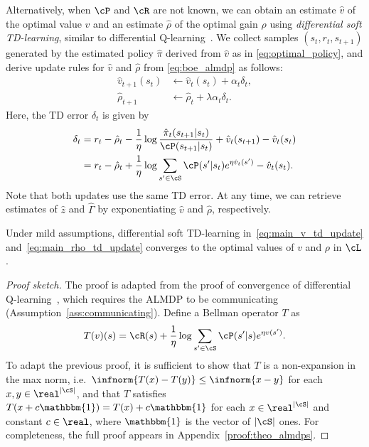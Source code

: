 Alternatively, when $\cP$ and $\cR$ are not known, we can obtain an estimate $\hat v$ of the optimal value $v$ and an estimate $\hat\rho$ of the optimal gain $\rho$ using \textit{differential soft TD-learning}, similar to differential Q-learning~\citep{Wan2021}. We collect samples $(s_t, r_t, s_{t+1})$ generated by the estimated policy $\hat\pi$ derived from $\hat v$ as in \eqref{eq:optimal_policy}, and derive update rules for $\hat v$ and $\hat \rho$ from \eqref{eq:boe_almdp} as follows:
\begin{align}
    \hat{v}_{t+1}(s_t) &\gets \hat{v}_t(s_t) + \alpha_t \delta_t,\label{eq:main_v_td_update}\\
    \hat{\rho}_{t+1} &\gets \hat{\rho}_t + \lambda \alpha_t \delta_t.\label{eq:main_rho_td_update}
    \end{align}
Here, the TD error $\delta_t$ is given by
\begin{align*}
\delta_t &= r_t - \hat{\rho}_t - \frac 1 \eta \log \frac {\hat{\pi}_t(s_{t+1}|s_t)} {\cP(s_{t+1}|s_t)} + \hat{v}_t(s_{t+1}) - \hat{v}_t(s_t)\\
 &= r_t - \hat{\rho}_t + \frac 1 \eta \log \sum_{s'\in\cS} \cP(s'|s_t) e^{\eta \hat{v}_t(s')} - \hat{v}_t(s_t).
\end{align*}
Note that both updates use the same TD error. At any time, we can retrieve estimates of $\hat z$ and $\widehat\Gamma$ by exponentiating $\hat v$ and $\hat \rho$, respectively.

\begin{theorem}
    Under mild assumptions, differential soft TD-learning in~\eqref{eq:main_v_td_update} and~\eqref{eq:main_rho_td_update} converges to the optimal values of $v$ and $\rho$ in $\cL$. \label{theo:almdps}
\end{theorem}

\begin{proof}[Proof sketch]
The proof is adapted from the proof of convergence of differential Q-learning~\cite{Abounadi2001,Wan2021}, which requires the ALMDP to be communicating (Assumption~\ref{ass:communicating}).
Define a Bellman operator $T$ as
\[
T(v)(s) = \cR(s) + \frac 1 \eta \log \sum_{s'\in\cS} \cP(s'|s) e^{ \eta v(s') }.
\]
To adapt the previous proof, it is sufficient to show that $T$ is a non-expansion in the max norm, i.e.~$\infnorm{T(x)-T(y)} \leq \infnorm{x - y}$ for each $x, y\in\real^{|\cS|}$, and that $T$ satisfies $T(x + c\mathbbm{1}) = T(x) + c\mathbbm{1}$ for each $x\in\real^{|\cS|}$ and constant $c\in\real$, where $\mathbbm{1}$ is the vector of $|\cS|$ ones.
For completeness, the full proof appears in Appendix~\ref{proof:theo_almdps}.
\end{proof}

